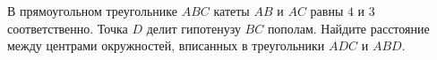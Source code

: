 \begin{ex}
	\begin{condition}
		В прямоугольном треугольнике \( ABC  \) катеты \( AB  \) и \( AC  \) равны \( 4 \) и \( 3  \) соответственно. Точка \( D  \) делит гипотенузу \( BC  \) пополам. Найдите расстояние между центрами окружностей, вписанных в треугольники	\( ADC  \) и \( ABD \).
	\end{condition}
\end{ex}